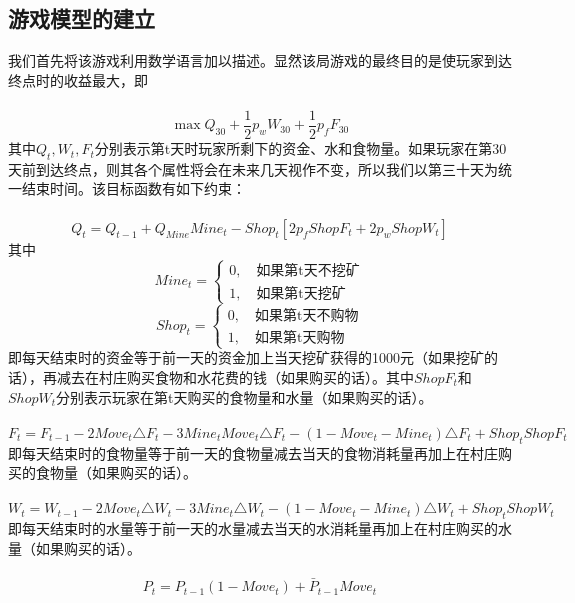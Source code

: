 \documentclass[withoutpre]{cumcmthesis} %
\begin{document}
\subsection{游戏模型的建立}

我们首先将该游戏利用数学语言加以描述。显然该局游戏的最终目的是使玩家到达终点时的收益最大，即\\\\
\begin{equation}
	\max Q_{30}+\frac{1}{2}p_wW_{30}+\frac{1}{2}p_fF_{30}
\end{equation}
其中$Q_{t},W_{t},F_{t}$分别表示第t天时玩家所剩下的资金、水和食物量。如果玩家在第30天前到达终点，则其各个属性将会在未来几天视作不变，所以我们以第三十天为统一结束时间。该目标函数有如下约束：\\\\
\begin{equation}
	Q_t=Q_{t-1}+Q_{Mine}Mine_t-Shop_t[2p_fShopF_t+2p_wShopW_t]
\end{equation}
其中$$Mine_t=\begin{cases}
0,\quad \text{如果第t天不挖矿}\\
1,\quad \text{如果第t天挖矿}
\end{cases}$$
$$Shop_t=\begin{cases}
0,\quad \text{如果第t天不购物}\\
1,\quad \text{如果第t天购物}
\end{cases}$$
即每天结束时的资金等于前一天的资金加上当天挖矿获得的1000元（如果挖矿的话），再减去在村庄购买食物和水花费的钱（如果购买的话）。其中$ShopF_t$和$ShopW_t$分别表示玩家在第t天购买的食物量和水量（如果购买的话）。\\\\
\begin{equation}
F_t=F_{t-1}-2Move_t\triangle F_t-3Mine_tMove_t\triangle F_t-(1-Move_t-Mine_t)\triangle F_t+Shop_tShopF_t
\end{equation}
即每天结束时的食物量等于前一天的食物量减去当天的食物消耗量再加上在村庄购买的食物量（如果购买的话）。\\\\
\begin{equation}
W_t=W_{t-1}-2Move_t\triangle W_t-3Mine_t\triangle W_t-(1-Move_t-Mine_t)\triangle W_t+Shop_tShopW_t
\end{equation}
即每天结束时的水量等于前一天的水量减去当天的水消耗量再加上在村庄购买的水量（如果购买的话）。\\\\
\begin{equation}
P_{t}=P_{t-1}(1-Move_t)+\bar{P}_{t-1}Move_t
\end{equation}
\end{document}
